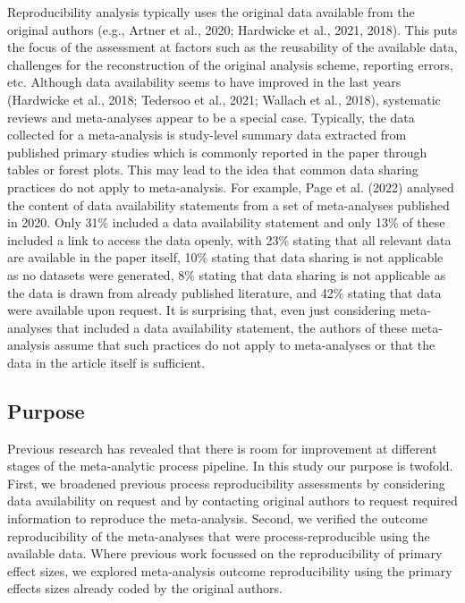\documentclass[
  ,apa7,floatsintext]{apa6}
\begin{document}
Reproducibility analysis typically uses the original data available from the original authors (e.g., Artner et al., 2020; Hardwicke et al., 2021, 2018). This puts the focus of the assessment at factors such as the reusability of the available data, challenges for the reconstruction of the original analysis scheme, reporting errors, etc. Although data availability seems to have improved in the last years (Hardwicke et al., 2018; Tedersoo et al., 2021; Wallach et al., 2018), systematic reviews and meta-analyses appear to be a special case. Typically, the data collected for a meta-analysis is study-level summary data extracted from published primary studies which is commonly reported in the paper through tables or forest plots. This may lead to the idea that common data sharing practices do not apply to meta-analysis. For example, Page et al. (2022) analysed the content of data availability statements from a set of meta-analyses published in 2020. Only 31\% included a data availability statement and only 13\% of these included a link to access the data openly, with 23\% stating that all relevant data are available in the paper itself, 10\% stating that data sharing is not applicable as no datasets were generated, 8\% stating that data sharing is not applicable as the data is drawn from already published literature, and 42\% stating that data were available upon request. It is surprising that, even just considering meta-analyses that included a data availability statement, the authors of these meta-analysis assume that such practices do not apply to meta-analyses or that the data in the article itself is sufficient.

\hypertarget{purpose}{%
\subsection{Purpose}\label{purpose}}

Previous research has revealed that there is room for improvement at different stages of the meta-analytic process pipeline. In this study our purpose is twofold. First, we broadened previous process reproducibility assessments by considering data availability on request and by contacting original authors to request required information to reproduce the meta-analysis. Second, we verified the outcome reproducibility of the meta-analyses that were process-reproducible using the available data. Where previous work focussed on the reproducibility of primary effect sizes, we explored meta-analysis outcome reproducibility using the primary effects sizes already coded by the original authors.
\end{document}

